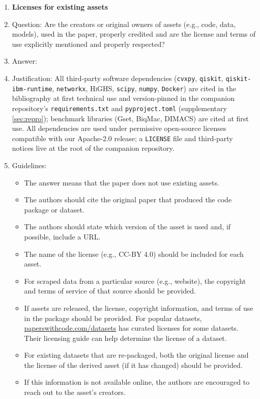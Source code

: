 \begin{enumerate}
\item {\bf Licenses for existing assets}
    \item[] Question: Are the creators or original owners of assets (e.g., code, data, models), used in the paper, properly credited and are the license and terms of use explicitly mentioned and properly respected?
    \item[] Answer: \answerYes{} %
    \item[] Justification: All third-party software dependencies
        (\texttt{cvxpy}, \texttt{qiskit}, \texttt{qiskit-ibm-runtime},
        \texttt{networkx}, \textsc{HiGHS}, \texttt{scipy},
        \texttt{numpy}, \texttt{Docker}) are cited in the bibliography
        at first technical use and version-pinned in the companion
        repository's \texttt{requirements.txt} and \texttt{pyproject.toml}
        (supplementary \cref{sec:repro}); benchmark libraries (Gset,
        BiqMac, DIMACS) are cited at first use. All dependencies are
        used under permissive open-source licenses compatible with our
        Apache-2.0 release; a \texttt{LICENSE} file and third-party
        notices live at the root of the companion repository.
    \item[] Guidelines:
    \begin{itemize}
        \item The answer \answerNA{} means that the paper does not use existing assets.
        \item The authors should cite the original paper that produced the code package or dataset.
        \item The authors should state which version of the asset is used and, if possible, include a URL.
        \item The name of the license (e.g., CC-BY 4.0) should be included for each asset.
        \item For scraped data from a particular source (e.g., website), the copyright and terms of service of that source should be provided.
        \item If assets are released, the license, copyright information, and terms of use in the package should be provided. For popular datasets, \url{paperswithcode.com/datasets} has curated licenses for some datasets. Their licensing guide can help determine the license of a dataset.
        \item For existing datasets that are re-packaged, both the original license and the license of the derived asset (if it has changed) should be provided.
        \item If this information is not available online, the authors are encouraged to reach out to the asset's creators.
    \end{itemize}


\end{enumerate}
